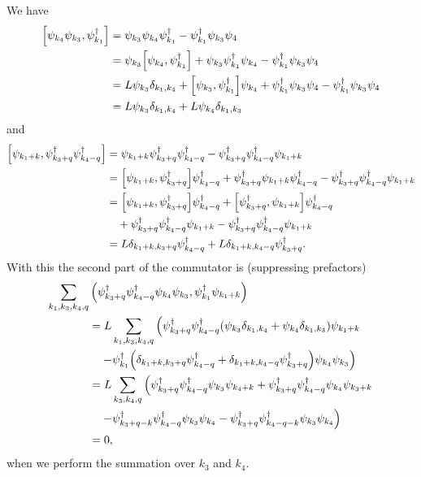 \documentclass[11pt, a4paper]{report} %
\begin{document}
We have 
\begin{align}
  \label{eq:9}
  \qty[\psi_{k_4}\psi_{k_3},\psi_{k_1}^{\dag}] &= \psi_{k_3}\psi_{k_4} \psi_{k_1}^{\dag} - \psi^{\dag}_{k_1} \psi_{k_3} \psi_4\\
                                           &= \psi_{k_3} \qty[\psi_{k_4}, \psi_{k_1}^{\dag}] + \psi_{k_3} \psi_{k_1}^{\dag} \psi_{k_4} - \psi^{\dag}_{k_1} \psi_{k_3} \psi_4\\
                                           &= L\psi_{k_3} \delta_{k_1, k_4} + \qty[\psi_{k_3}, \psi_{k_1}^{\dag}] \psi_{k_4} + \psi^{\dag}_{k_1} \psi_{k_3} \psi_4  - \psi^{\dag}_{k_1} \psi_{k_3} \psi_4\\
                                           &= L\psi_{k_3} \delta_{k_1, k_4} + L\psi_{k_4} \delta_{k_1,k_3}
\end{align}
and 
\begin{align}
  \label{eq:10}
  \qty[\psi_{k_1+k},\psi_{k_3+q}^{\dag}\psi_{k_4-q}^{\dag}] &= \psi_{k_1+k}\psi_{k_3+q}^{\dag}\psi_{k_4-q}^{\dag} - \psi_{k_3+q}^{\dag}\psi_{k_4-q}^{\dag}\psi_{k_1+k}\\
                                                        & = \qty[\psi_{k_1+k},\psi_{k_3+q}^{\dag}] \psi_{k_4-q}^{\dag} + \psi_{k_3+q}^{\dag} \psi_{k_1+k} \psi_{k_4-q}^{\dag} - \psi_{k_3+q}^{\dag}\psi_{k_4-q}^{\dag}\psi_{k_1+k}\\
                                                        &= \qty[\psi_{k_1+k},\psi_{k_3+q}^{\dag}] \psi_{k_4-q}^{\dag} + \qty[\psi_{k_3+q}^{\dag}, \psi_{k_1+k} ]\psi_{k_4-q}^{\dag} \nonumber\\
&\quad+ \psi_{k_3+q}^{\dag}\psi_{k_4-q}^{\dag}\psi_{k_1+k} - \psi_{k_3+q}^{\dag}\psi_{k_4-q}^{\dag}\psi_{k_1+k}\\
                                                        &= L\delta_{k_1+k,k_3+q} \psi_{k_4-q}^{\dag} + L\delta_{k_1+k,k_4-q} \psi_{k_3+q}^{\dag}.
\end{align}
With this the second part of the commutator is (suppressing prefactors)
\begin{align}
  \label{eq:11}
   \sum_{k_1,k_3,k_4,q}  &\left(\psi_{k_3+q}^{\dag}\psi_{k_4-q}^{\dag}\psi_{k_4}\psi_{k_3}, \psi_{k_1}^{\dag}\psi_{k_1+k}\right)\\
  &=L\sum_{k_1,k_3,k_4,q}  \left(\psi_{k_3+q}^{\dag}\psi_{k_4-q}^{\dag}\qty(\psi_{k_3} \delta_{k_1, k_4} + \psi_{k_4} \delta_{k_1,k_3})\psi_{k_1+k} \right.\nonumber\\
 &\quad \left.  - \psi_{k_1}^{\dag}\qty(\delta_{k_1+k,k_3+q} \psi_{k_4-q}^{\dag} + \delta_{k_1+k,k_4-q} \psi_{k_3+q}^{\dag})\psi_{k_4}\psi_{k_3}\right)\\
 &=L\sum_{k_3,k_4,q} \left( \psi_{k_3+q}^{\dag}\psi_{k_4-q}^{\dag}\psi_{k_3} \psi_{k_4+k} +  \psi_{k_3+q}^{\dag}\psi_{k_4-q}^{\dag}\psi_{k_4} \psi_{k_3+k}\right.\nonumber\\
 & \quad \left. -  \psi_{k_3+q-k}^{\dag}\psi_{k_4-q}^{\dag}\psi_{k_3} \psi_{k_4} - \psi_{k_3+q}^{\dag}\psi_{k_4-q-k}^{\dag}\psi_{k_3} \psi_{k_4}\right)\\
&= 0,
\end{align}
when we perform the summation over \(k_3\) and \(k_4\).
\end{document}
